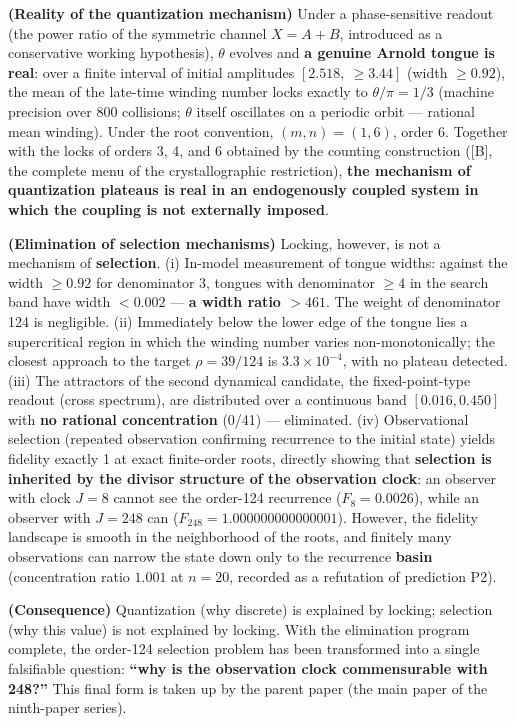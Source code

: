 \documentclass[
  a4paper,
]{article}
\begin{document}
\textbf{(Reality of the quantization mechanism)} Under a phase-sensitive
readout (the power ratio of the symmetric channel \(X=A+B\), introduced
as a conservative working hypothesis), \(\theta\) evolves and \textbf{a
genuine Arnold tongue is real}: over a finite interval of initial
amplitudes \([2.518,\ \ge3.44]\) (width \(\ge0.92\)), the mean of the
late-time winding number locks exactly to \(\theta/\pi=1/3\) (machine
precision over 800 collisions; \(\theta\) itself oscillates on a
periodic orbit --- rational mean winding). Under the root convention,
\((m,n)=(1,6)\), order 6. Together with the locks of orders 3, 4, and 6
obtained by the counting construction ({[}B{]}, the complete menu of the
crystallographic restriction), \textbf{the mechanism of quantization
plateaus is real in an endogenously coupled system in which the coupling
is not externally imposed}.

\textbf{(Elimination of selection mechanisms)} Locking, however, is not
a mechanism of \textbf{selection}. (i) In-model measurement of tongue
widths: against the width \(\ge0.92\) for denominator 3, tongues with
denominator \(\ge4\) in the search band have width \(<0.002\) ---
\textbf{a width ratio \(>461\)}. The weight of denominator 124 is
negligible. (ii) Immediately below the lower edge of the tongue lies a
supercritical region in which the winding number varies
non-monotonically; the closest approach to the target \(\rho=39/124\) is
\(3.3\times10^{-4}\), with no plateau detected. (iii) The attractors of
the second dynamical candidate, the fixed-point-type readout (cross
spectrum), are distributed over a continuous band \([0.016,0.450]\) with
\textbf{no rational concentration} (0/41) --- eliminated. (iv)
Observational selection (repeated observation confirming recurrence to
the initial state) yields fidelity exactly 1 at exact finite-order
roots, directly showing that \textbf{selection is inherited by the
divisor structure of the observation clock}: an observer with clock
\(J=8\) cannot see the order-124 recurrence (\(F_8=0.0026\)), while an
observer with \(J=248\) can (\(F_{248}=1.000000000000001\)). However,
the fidelity landscape is smooth in the neighborhood of the roots, and
finitely many observations can narrow the state down only to the
recurrence \textbf{basin} (concentration ratio \(1.001\) at \(n=20\),
recorded as a refutation of prediction P2).

\textbf{(Consequence)} Quantization (why discrete) is explained by
locking; selection (why this value) is not explained by locking. With
the elimination program complete, the order-124 selection problem has
been transformed into a single falsifiable question: \textbf{``why is
the observation clock commensurable with 248?''} This final form is
taken up by the parent paper (the main paper of the ninth-paper series).
\end{document}
